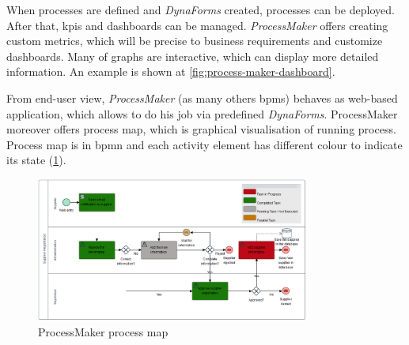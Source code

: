  When processes are defined and \textit{DynaForms} created, processes can be deployed. After that, \gls{kpi}s and dashboards can be managed. \textit{ProcessMaker} offers creating custom metrics, which will be precise to business requirements and customize dashboards. Many of graphs are interactive, which can display more detailed information. An example is shown at \cref{fig:process-maker-dashboard}.
 
 From end-user view, \textit{ProcessMaker} (as many others \gls{bpms}) behaves as web-based application, which allows to do his job via predefined \textit{DynaForms}. ProcessMaker moreover offers process map, which is graphical visualisation of running process. Process map is in \gls{bpmn} and each activity element has different colour to indicate its state (\cref{fig:process-maker-process-map}).
 
  \begin{figure}[ht!]
	\centering
    \includegraphics[width=0.8\textwidth, keepaspectratio]{img/process-maker-map.PNG}
    \caption{ProcessMaker process map}
    \label{fig:process-maker-process-map}
\end{figure} 

